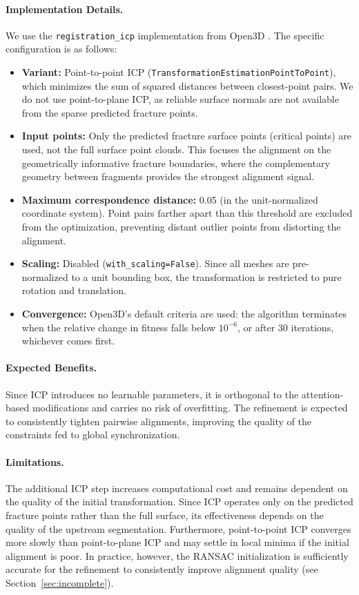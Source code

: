\paragraph{Implementation Details.}
We use the \texttt{registration\_icp} implementation from Open3D \cite{Zhou2018open3d}. The specific configuration is as follows:

\begin{itemize}
    \item \textbf{Variant:} Point-to-point ICP (\texttt{TransformationEstimationPointToPoint}), which minimizes the sum of squared distances between closest-point pairs. We do not use point-to-plane ICP, as reliable surface normals are not available from the sparse predicted fracture points.
    \item \textbf{Input points:} Only the predicted fracture surface points (critical points) are used, not the full surface point clouds. This focuses the alignment on the geometrically informative fracture boundaries, where the complementary geometry between fragments provides the strongest alignment signal.
    \item \textbf{Maximum correspondence distance:} 0.05 (in the unit-normalized coordinate system). Point pairs farther apart than this threshold are excluded from the optimization, preventing distant outlier points from distorting the alignment.
    \item \textbf{Scaling:} Disabled (\texttt{with\_scaling=False}). Since all meshes are pre-normalized to a unit bounding box, the transformation is restricted to pure rotation and translation.
    \item \textbf{Convergence:} Open3D's default criteria are used: the algorithm terminates when the relative change in fitness falls below $10^{-6}$, or after 30 iterations, whichever comes first.
\end{itemize}

\paragraph{Expected Benefits.}
Since ICP introduces no learnable parameters, it is orthogonal to the attention-based modifications and carries no risk of overfitting. The refinement is expected to consistently tighten pairwise alignments, improving the quality of the constraints fed to global synchronization.

\paragraph{Limitations.}
The additional ICP step increases computational cost and remains dependent on the quality of the initial transformation. Since ICP operates only on the predicted fracture points rather than the full surface, its effectiveness depends on the quality of the upstream segmentation. Furthermore, point-to-point ICP converges more slowly than point-to-plane ICP and may settle in local minima if the initial alignment is poor. In practice, however, the RANSAC initialization is sufficiently accurate for the refinement to consistently improve alignment quality (see Section~\ref{sec:incomplete}).